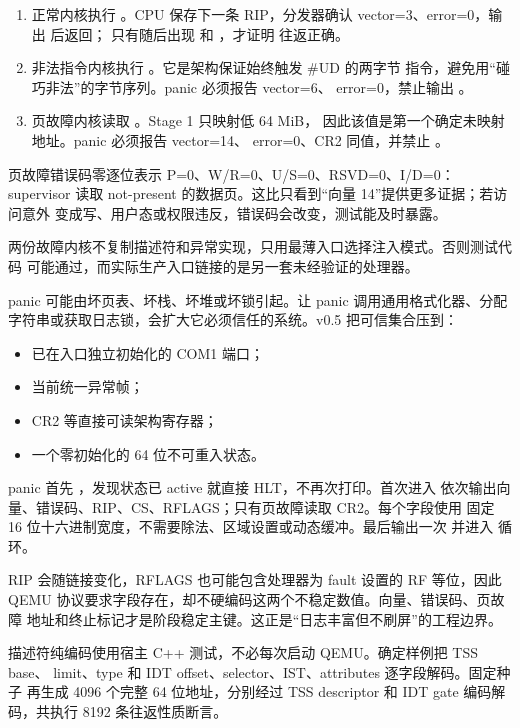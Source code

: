 \begin{enumerate}
  \item 正常内核执行 。CPU 保存下一条 RIP，分发器确认
        vector=3、error=0，输出  后返回；
        只有随后出现  和
        ，才证明  往返正确。
  \item 非法指令内核执行 。它是架构保证始终触发 \#UD 的两字节
        指令，避免用“碰巧非法”的字节序列。panic 必须报告 vector=6、
        error=0，禁止输出 。
  \item 页故障内核读取 。Stage 1 只映射低 64 MiB，
        因此该值是第一个确定未映射地址。panic 必须报告 vector=14、
        error=0、CR2 同值，并禁止 。
\end{enumerate}

页故障错误码零逐位表示 P=0、W/R=0、U/S=0、RSVD=0、I/D=0：supervisor
读取 not-present 的数据页。这比只看到“向量 14”提供更多证据；若访问意外
变成写、用户态或权限违反，错误码会改变，测试能及时暴露。

两份故障内核不复制描述符和异常实现，只用最薄入口选择注入模式。否则测试代码
可能通过，而实际生产入口链接的是另一套未经验证的处理器。

panic 可能由坏页表、坏栈、坏堆或坏锁引起。让 panic 调用通用格式化器、分配
字符串或获取日志锁，会扩大它必须信任的系统。v0.5 把可信集合压到：

\begin{itemize}
  \item 已在入口独立初始化的 COM1 端口；
  \item 当前统一异常帧；
  \item CR2 等直接可读架构寄存器；
  \item 一个零初始化的 64 位不可重入状态。
\end{itemize}

panic 首先 ，发现状态已 active 就直接 HLT，不再次打印。首次进入
依次输出向量、错误码、RIP、CS、RFLAGS；只有页故障读取 CR2。每个字段使用
固定 16 位十六进制宽度，不需要除法、区域设置或动态缓冲。最后输出一次
 并进入  循环。

RIP 会随链接变化，RFLAGS 也可能包含处理器为 fault 设置的 RF 等位，因此
QEMU 协议要求字段存在，却不硬编码这两个不稳定数值。向量、错误码、页故障
地址和终止标记才是阶段稳定主键。这正是“日志丰富但不刷屏”的工程边界。

描述符纯编码使用宿主 C++ 测试，不必每次启动 QEMU。确定样例把 TSS base、
limit、type 和 IDT offset、selector、IST、attributes 逐字段解码。固定种子
 再生成 4096 个完整 64 位地址，分别经过 TSS
descriptor 和 IDT gate 编码解码，共执行 8192 条往返性质断言。


